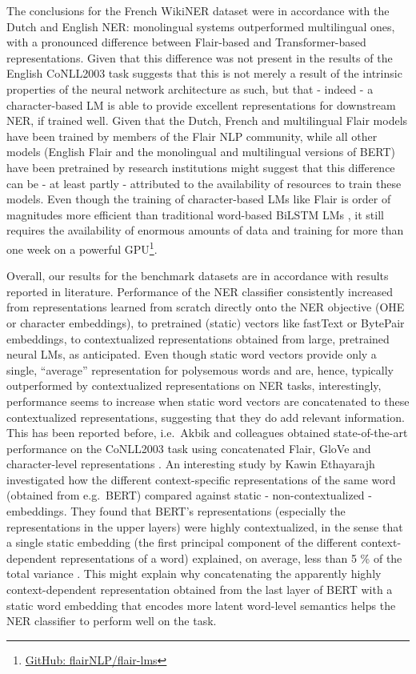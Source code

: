 \documentclass[12pt,a4paper,]{book}
\begin{document}
The conclusions for the French WikiNER dataset were in accordance with the Dutch and English NER: monolingual systems outperformed multilingual ones, with a pronounced difference between Flair-based and Transformer-based representations. Given that this difference was not present in the results of the English CoNLL2003 task suggests that this is not merely a result of the intrinsic properties of the neural network architecture as such, but that - indeed - a character-based LM is able to provide excellent representations for downstream NER, if trained well. Given that the Dutch, French and multilingual Flair models have been trained by members of the Flair NLP community, while all other models (English Flair and the monolingual and multilingual versions of BERT) have been pretrained by research institutions might suggest that this difference can be - at least partly - attributed to the availability of resources to train these models. Even though the training of character-based LMs like Flair is order of magnitudes more efficient than traditional word-based BiLSTM LMs \citep{akbik2018}, it still requires the availability of enormous amounts of data and training for more than one week on a powerful GPU\footnote{\href{https://github.com/flairNLP/flair-lms}{GitHub: flairNLP/flair-lms}}.

Overall, our results for the benchmark datasets are in accordance with results reported in literature. Performance of the NER classifier consistently increased from representations learned from scratch directly onto the NER objective (OHE or character embeddings), to pretrained (static) vectors like fastText or BytePair embeddings, to contextualized representations obtained from large, pretrained neural LMs, as anticipated. Even though static word vectors provide only a single, ``average'' representation for polysemous words and are, hence, typically outperformed by contextualized representations on NER tasks, interestingly, performance seems to increase when static word vectors are concatenated to these contextualized representations, suggesting that they do add relevant information. This has been reported before, i.e.~Akbik and colleagues obtained state-of-the-art performance on the CoNLL2003 task using concatenated Flair, GloVe and character-level representations \citep{akbik2018}. An interesting study by Kawin Ethayarajh investigated how the different context-specific representations of the same word (obtained from e.g.~BERT) compared against static - non-contextualized - embeddings. They found that BERT's representations (especially the representations in the upper layers) were highly contextualized, in the sense that a single static embedding (the first principal component of the different context-dependent representations of a word) explained, on average, less than 5 \% of the total variance \citep{ethayarajh2019}. This might explain why concatenating the apparently highly context-dependent representation obtained from the last layer of BERT with a static word embedding that encodes more latent word-level semantics helps the NER classifier to perform well on the task.
\end{document}
